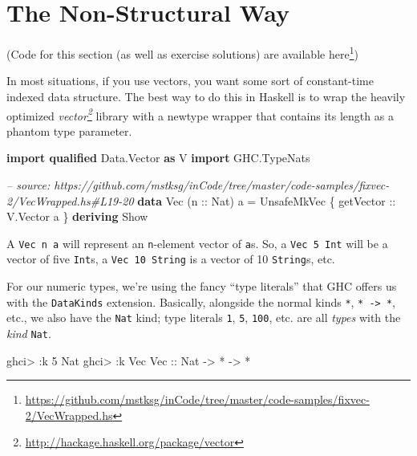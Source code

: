 \documentclass[]{article}
\newenvironment{Shaded}{}{}
\newcommand{\KeywordTok}[1]{\textcolor[rgb]{0.00,0.44,0.13}{\textbf{#1}}}
\newcommand{\DataTypeTok}[1]{\textcolor[rgb]{0.56,0.13,0.00}{#1}}
\newcommand{\DecValTok}[1]{\textcolor[rgb]{0.25,0.63,0.44}{#1}}
\newcommand{\CommentTok}[1]{\textcolor[rgb]{0.38,0.63,0.69}{\textit{#1}}}
\newcommand{\OtherTok}[1]{\textcolor[rgb]{0.00,0.44,0.13}{#1}}
\newcommand{\FunctionTok}[1]{\textcolor[rgb]{0.02,0.16,0.49}{#1}}
\newcommand{\NormalTok}[1]{#1}
\renewcommand{\href}[2]{#2\footnote{\url{#1}}}
\begin{document}
\section{The Non-Structural Way}\label{the-non-structural-way}

(Code for this section (as well as exercise solutions) are
\href{https://github.com/mstksg/inCode/tree/master/code-samples/fixvec-2/VecWrapped.hs}{available
here})

In most situations, if you use vectors, you want some sort of constant-time
indexed data structure. The best way to do this in Haskell is to wrap the
heavily optimized
\emph{\href{http://hackage.haskell.org/package/vector}{vector}} library with a
newtype wrapper that contains its length as a phantom type parameter.

\begin{Shaded}
\begin{Highlighting}[]
\KeywordTok{import qualified} \DataTypeTok{Data.Vector} \KeywordTok{as} \DataTypeTok{V}
\KeywordTok{import           }\DataTypeTok{GHC.TypeNats}

\CommentTok{-- source: https://github.com/mstksg/inCode/tree/master/code-samples/fixvec-2/VecWrapped.hs#L19-20}
\KeywordTok{data} \DataTypeTok{Vec}\NormalTok{ (}\OtherTok{n ::} \DataTypeTok{Nat}\NormalTok{) a }\FunctionTok{=} \DataTypeTok{UnsafeMkVec}\NormalTok{ \{}\OtherTok{ getVector ::} \DataTypeTok{V.Vector}\NormalTok{ a \}}
    \KeywordTok{deriving} \DataTypeTok{Show}
\end{Highlighting}
\end{Shaded}

A \texttt{Vec\ n\ a} will represent an \texttt{n}-element vector of \texttt{a}s.
So, a \texttt{Vec\ 5\ Int} will be a vector of five \texttt{Int}s, a
\texttt{Vec\ 10\ String} is a vector of 10 \texttt{String}s, etc.

For our numeric types, we're using the fancy ``type literals'' that GHC offers
us with the \texttt{DataKinds} extension. Basically, alongside the normal kinds
\texttt{*}, \texttt{*\ -\textgreater{}\ *}, etc., we also have the \texttt{Nat}
kind; type literals \texttt{1}, \texttt{5}, \texttt{100}, etc. are all
\emph{types} with the \emph{kind} \texttt{Nat}.

\begin{Shaded}
\begin{Highlighting}[]
\NormalTok{ghci}\FunctionTok{>} \FunctionTok{:}\NormalTok{k }\DecValTok{5}
\DataTypeTok{Nat}
\NormalTok{ghci}\FunctionTok{>} \FunctionTok{:}\NormalTok{k }\DataTypeTok{Vec}
\DataTypeTok{Vec}\OtherTok{ ::} \DataTypeTok{Nat} \OtherTok{->} \FunctionTok{*} \OtherTok{->} \FunctionTok{*}
\end{Highlighting}
\end{Shaded}
\end{document}
